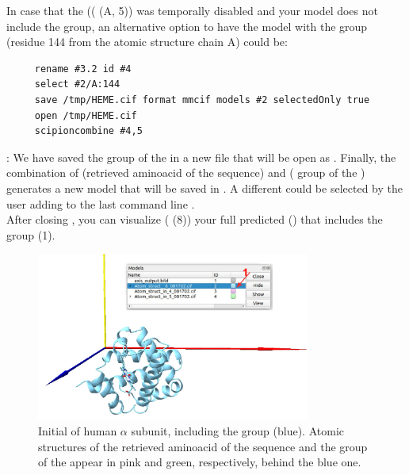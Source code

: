 In case that the   (( (A, 5)) was temporally disabled and your model does not include the  group, an alternative option to have the model with the  group (residue 144 from the atomic structure  chain A) could be:
\begin{verbatim}
     rename #3.2 id #4
     select #2/A:144
     save /tmp/HEME.cif format mmcif models #2 selectedOnly true 
     open /tmp/HEME.cif
     scipioncombine #4,5 
 \end{verbatim}
 : We have saved the  group of the   in a new file that will be open as  . Finally, the combination of   (retrieved aminoacid  of the  sequence) and  ( group of the  ) generates a new model  that will be saved in \scipion. A different  could be selected by the user adding to the last command line .\\

After closing \chimera, you can visualize ( (8)) your full predicted  () that includes the  group (1). 
 
 \begin{figure}[H]
  \centering 
  \captionsetup{width=.7\linewidth} 
  \includegraphics[width=0.80\textwidth]{Images/Fig16}
  \caption{Initial  of human  $\alpha$ subunit, including the  group (blue). Atomic structures of the retrieved aminoacid  of the  sequence and the  group of the   appear in pink and green, respectively, behind the blue one.}
  \label{fig:chimera_model}
  \end{figure}
  
